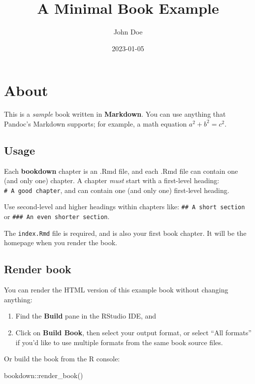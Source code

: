 \documentclass[
]{book}
\title{A Minimal Book Example}
\author{John Doe}
\date{2023-01-05}
\newenvironment{Shaded}{\begin{snugshade}}{\end{snugshade}}
\newcommand{\FunctionTok}[1]{\textcolor[rgb]{0.00,0.00,0.00}{#1}}
\newcommand{\NormalTok}[1]{#1}
\newcommand{\SpecialCharTok}[1]{\textcolor[rgb]{0.00,0.00,0.00}{#1}}
\theoremstyle{definition}
\theoremstyle{definition}
\theoremstyle{definition}
\theoremstyle{definition}
\theoremstyle{remark}
\begin{document}
\maketitle

{
\setcounter{tocdepth}{1}
\tableofcontents
}
\hypertarget{about}{%
\chapter{About}\label{about}}

This is a \emph{sample} book written in \textbf{Markdown}. You can use anything that Pandoc's Markdown supports; for example, a math equation \(a^2 + b^2 = c^2\).

\hypertarget{usage}{%
\section{Usage}\label{usage}}

Each \textbf{bookdown} chapter is an .Rmd file, and each .Rmd file can contain one (and only one) chapter. A chapter \emph{must} start with a first-level heading: \texttt{\#\ A\ good\ chapter}, and can contain one (and only one) first-level heading.

Use second-level and higher headings within chapters like: \texttt{\#\#\ A\ short\ section} or \texttt{\#\#\#\ An\ even\ shorter\ section}.

The \texttt{index.Rmd} file is required, and is also your first book chapter. It will be the homepage when you render the book.

\hypertarget{render-book}{%
\section{Render book}\label{render-book}}

You can render the HTML version of this example book without changing anything:

\begin{enumerate}
\def\labelenumi{\arabic{enumi}.}
\item
  Find the \textbf{Build} pane in the RStudio IDE, and
\item
  Click on \textbf{Build Book}, then select your output format, or select ``All formats'' if you'd like to use multiple formats from the same book source files.
\end{enumerate}

Or build the book from the R console:

\begin{Shaded}
\begin{Highlighting}[]
\NormalTok{bookdown}\SpecialCharTok{::}\FunctionTok{render\_book}\NormalTok{()}
\end{Highlighting}
\end{Shaded}
\end{document}
